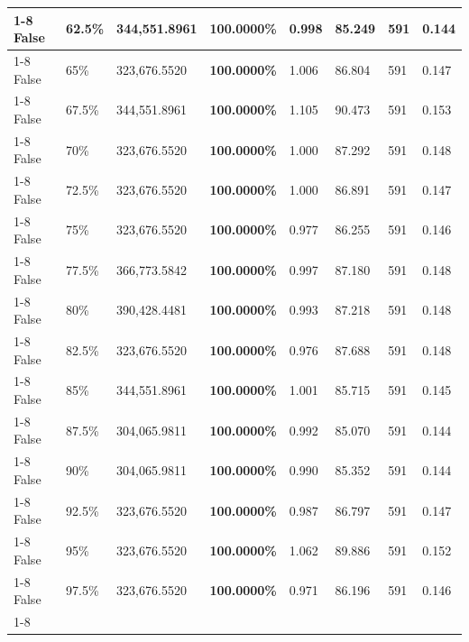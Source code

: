 \begin{table}[H]
\begin{tabular}{lllrllll}
\cline{1-8} \cline{2-8}
False & 62.5\% & 344,551.8961 & \bfseries \color{red} 100.0000\% & 0.998 & 85.249 & 591 & 0.144 \\
\cline{1-8} \cline{2-8}
False & 65\% & 323,676.5520 & \bfseries \color{red} 100.0000\% & 1.006 & 86.804 & 591 & 0.147 \\
\cline{1-8} \cline{2-8}
False & 67.5\% & 344,551.8961 & \bfseries \color{red} 100.0000\% & 1.105 & 90.473 & 591 & 0.153 \\
\cline{1-8} \cline{2-8}
False & 70\% & 323,676.5520 & \bfseries \color{red} 100.0000\% & 1.000 & 87.292 & 591 & 0.148 \\
\cline{1-8} \cline{2-8}
False & 72.5\% & 323,676.5520 & \bfseries \color{red} 100.0000\% & 1.000 & 86.891 & 591 & 0.147 \\
\cline{1-8} \cline{2-8}
False & 75\% & 323,676.5520 & \bfseries \color{red} 100.0000\% & 0.977 & 86.255 & 591 & 0.146 \\
\cline{1-8} \cline{2-8}
False & 77.5\% & 366,773.5842 & \bfseries \color{red} 100.0000\% & 0.997 & 87.180 & 591 & 0.148 \\
\cline{1-8} \cline{2-8}
False & 80\% & 390,428.4481 & \bfseries \color{red} 100.0000\% & 0.993 & 87.218 & 591 & 0.148 \\
\cline{1-8} \cline{2-8}
False & 82.5\% & 323,676.5520 & \bfseries \color{red} 100.0000\% & 0.976 & 87.688 & 591 & 0.148 \\
\cline{1-8} \cline{2-8}
False & 85\% & 344,551.8961 & \bfseries \color{red} 100.0000\% & 1.001 & 85.715 & 591 & 0.145 \\
\cline{1-8} \cline{2-8}
False & 87.5\% & \color{red} 304,065.9811 & \bfseries \color{red} 100.0000\% & 0.992 & 85.070 & 591 & 0.144 \\
\cline{1-8} \cline{2-8}
False & 90\% & \color{red} 304,065.9811 & \bfseries \color{red} 100.0000\% & 0.990 & 85.352 & 591 & 0.144 \\
\cline{1-8} \cline{2-8}
False & 92.5\% & 323,676.5520 & \bfseries \color{red} 100.0000\% & 0.987 & 86.797 & 591 & 0.147 \\
\cline{1-8} \cline{2-8}
False & 95\% & 323,676.5520 & \bfseries \color{red} 100.0000\% & 1.062 & 89.886 & 591 & 0.152 \\
\cline{1-8} \cline{2-8}
False & 97.5\% & 323,676.5520 & \bfseries \color{red} 100.0000\% & 0.971 & 86.196 & 591 & 0.146 \\
\cline{1-8} \cline{2-8}
\bottomrule
\end{tabular}
\end{table}
